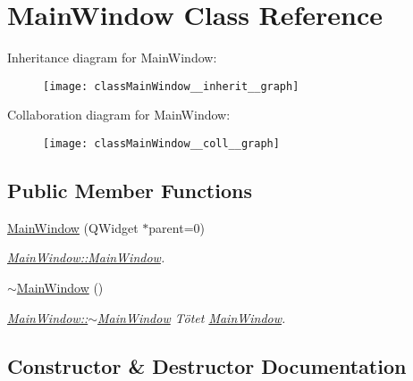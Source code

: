 \hypertarget{classMainWindow}{}\section{Main\+Window Class Reference}
\label{classMainWindow}


Inheritance diagram for Main\+Window\+:
\nopagebreak
\begin{figure}[H]
\begin{center}
\leavevmode
\texttt{[image: classMainWindow\_\_inherit\_\_graph]}
\end{center}
\end{figure}


Collaboration diagram for Main\+Window\+:
\nopagebreak
\begin{figure}[H]
\begin{center}
\leavevmode
\texttt{[image: classMainWindow\_\_coll\_\_graph]}
\end{center}
\end{figure}
\subsection*{Public Member Functions}
\begin{DoxyCompactItemize}
\item 
\hyperlink{classMainWindow_a8b244be8b7b7db1b08de2a2acb9409db}{Main\+Window} (Q\+Widget $\ast$parent=0)
\begin{DoxyCompactList}\small\item\em \hyperlink{classMainWindow_a8b244be8b7b7db1b08de2a2acb9409db}{Main\+Window\+::\+Main\+Window}. \end{DoxyCompactList}\item 
\hypertarget{classMainWindow_ae98d00a93bc118200eeef9f9bba1dba7}{}\hyperlink{classMainWindow_ae98d00a93bc118200eeef9f9bba1dba7}{$\sim$\+Main\+Window} ()\label{classMainWindow_ae98d00a93bc118200eeef9f9bba1dba7}

\begin{DoxyCompactList}\small\item\em \hyperlink{classMainWindow_ae98d00a93bc118200eeef9f9bba1dba7}{Main\+Window\+::$\sim$\+Main\+Window} Tötet \hyperlink{classMainWindow}{Main\+Window}. \end{DoxyCompactList}\end{DoxyCompactItemize}


\subsection{Constructor \& Destructor Documentation}
\hypertarget{classMainWindow_a8b244be8b7b7db1b08de2a2acb9409db}{}
